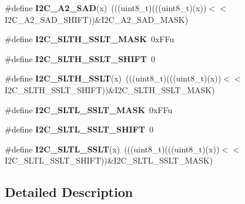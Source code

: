 \begin{DoxyCompactItemize}
\item 
\#define {\bfseries I2\+C\+\_\+\+A2\+\_\+\+S\+AD}(x)~(((uint8\+\_\+t)(((uint8\+\_\+t)(x))$<$$<$I2\+C\+\_\+\+A2\+\_\+\+S\+A\+D\+\_\+\+S\+H\+I\+FT))\&I2\+C\+\_\+\+A2\+\_\+\+S\+A\+D\+\_\+\+M\+A\+SK)\hypertarget{group__I2C__Register__Masks_gadb02a0d0b664b563e9f18a9a4d90fb8f}{}\label{group__I2C__Register__Masks_gadb02a0d0b664b563e9f18a9a4d90fb8f}

\item 
\#define {\bfseries I2\+C\+\_\+\+S\+L\+T\+H\+\_\+\+S\+S\+L\+T\+\_\+\+M\+A\+SK}~0x\+F\+Fu\hypertarget{group__I2C__Register__Masks_gaeef081c4825bc9248b218f4c6ee70f86}{}\label{group__I2C__Register__Masks_gaeef081c4825bc9248b218f4c6ee70f86}

\item 
\#define {\bfseries I2\+C\+\_\+\+S\+L\+T\+H\+\_\+\+S\+S\+L\+T\+\_\+\+S\+H\+I\+FT}~0\hypertarget{group__I2C__Register__Masks_gadc7429d429b6c58a18bcf147884e618f}{}\label{group__I2C__Register__Masks_gadc7429d429b6c58a18bcf147884e618f}

\item 
\#define {\bfseries I2\+C\+\_\+\+S\+L\+T\+H\+\_\+\+S\+S\+LT}(x)~(((uint8\+\_\+t)(((uint8\+\_\+t)(x))$<$$<$I2\+C\+\_\+\+S\+L\+T\+H\+\_\+\+S\+S\+L\+T\+\_\+\+S\+H\+I\+FT))\&I2\+C\+\_\+\+S\+L\+T\+H\+\_\+\+S\+S\+L\+T\+\_\+\+M\+A\+SK)\hypertarget{group__I2C__Register__Masks_gaf6d95ca3bdf2d8da490e7ff3c4a937b7}{}\label{group__I2C__Register__Masks_gaf6d95ca3bdf2d8da490e7ff3c4a937b7}

\item 
\#define {\bfseries I2\+C\+\_\+\+S\+L\+T\+L\+\_\+\+S\+S\+L\+T\+\_\+\+M\+A\+SK}~0x\+F\+Fu\hypertarget{group__I2C__Register__Masks_gac29118698aa1c246c26835a19210a0c9}{}\label{group__I2C__Register__Masks_gac29118698aa1c246c26835a19210a0c9}

\item 
\#define {\bfseries I2\+C\+\_\+\+S\+L\+T\+L\+\_\+\+S\+S\+L\+T\+\_\+\+S\+H\+I\+FT}~0\hypertarget{group__I2C__Register__Masks_ga177f38e09f29a382b35b19906462204f}{}\label{group__I2C__Register__Masks_ga177f38e09f29a382b35b19906462204f}

\item 
\#define {\bfseries I2\+C\+\_\+\+S\+L\+T\+L\+\_\+\+S\+S\+LT}(x)~(((uint8\+\_\+t)(((uint8\+\_\+t)(x))$<$$<$I2\+C\+\_\+\+S\+L\+T\+L\+\_\+\+S\+S\+L\+T\+\_\+\+S\+H\+I\+FT))\&I2\+C\+\_\+\+S\+L\+T\+L\+\_\+\+S\+S\+L\+T\+\_\+\+M\+A\+SK)\hypertarget{group__I2C__Register__Masks_gab7bec69c829adac299ed11bd66411507}{}\label{group__I2C__Register__Masks_gab7bec69c829adac299ed11bd66411507}

\end{DoxyCompactItemize}


\subsection{Detailed Description}
